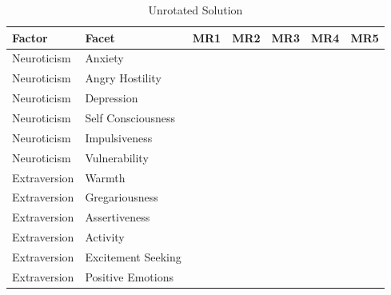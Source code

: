 \documentclass{article}\usepackage[]{graphicx}\usepackage[]{color}
\begin{document}
\begin{table}
\caption{\label{tab:unnamed-chunk-13}Unrotated Solution}
\centering
\begin{tabular}[t]{lllllll}
\toprule
Factor & Facet & MR1 & MR2 & MR3 & MR4 & MR5\\
\midrule
Neuroticism & Anxiety & \cellcolor{white}{0.26} & \cellcolor{yellow}{0.78} & \cellcolor{white}{0.25} & \cellcolor{white}{0.09} & \cellcolor{white}{0}\\
Neuroticism & Angry Hostility & \cellcolor{white}{0.03} & \cellcolor{white}{0.47} & \cellcolor{white}{0.12} & \cellcolor{yellow}{0.69} & \cellcolor{white}{0.02}\\
Neuroticism & Depression & \cellcolor{white}{0.08} & \cellcolor{yellow}{0.87} & \cellcolor{white}{0.05} & \cellcolor{white}{0.12} & \cellcolor{white}{-0.05}\\
Neuroticism & Self Consciousness & \cellcolor{white}{0.17} & \cellcolor{yellow}{0.72} & \cellcolor{white}{0.28} & \cellcolor{white}{-0.04} & \cellcolor{white}{0.03}\\
Neuroticism & Impulsiveness & \cellcolor{white}{0.29} & \cellcolor{white}{0.43} & \cellcolor{white}{-0.22} & \cellcolor{white}{0.31} & \cellcolor{white}{-0.18}\\
\addlinespace
Neuroticism & Vulnerability & \cellcolor{white}{0.05} & \cellcolor{yellow}{0.81} & \cellcolor{white}{0.12} & \cellcolor{white}{0.07} & \cellcolor{white}{-0.11}\\
Extraversion & Warmth & \cellcolor{yellow}{0.73} & \cellcolor{white}{-0.14} & \cellcolor{white}{-0.24} & \cellcolor{white}{-0.01} & \cellcolor{white}{-0.38}\\
Extraversion & Gregariousness & \cellcolor{yellow}{0.53} & \cellcolor{white}{-0.2} & \cellcolor{white}{-0.27} & \cellcolor{white}{0.19} & \cellcolor{white}{-0.34}\\
Extraversion & Assertiveness & \cellcolor{white}{0.47} & \cellcolor{white}{-0.42} & \cellcolor{white}{-0.04} & \cellcolor{white}{0.38} & \cellcolor{white}{-0.12}\\
Extraversion & Activity & \cellcolor{yellow}{0.62} & \cellcolor{white}{-0.21} & \cellcolor{white}{0.02} & \cellcolor{white}{0.38} & \cellcolor{white}{-0.02}\\
\addlinespace
Extraversion & Excitement Seeking & \cellcolor{white}{0.42} & \cellcolor{white}{-0.07} & \cellcolor{white}{-0.35} & \cellcolor{white}{0.22} & \cellcolor{white}{-0.01}\\
Extraversion & Positive Emotions & \cellcolor{yellow}{0.7} & \cellcolor{white}{-0.3} & \cellcolor{white}{-0.32} & \cellcolor{white}{-0.01} & \cellcolor{white}{-0.08}\\

\end{tabular}
\end{table}
\end{document}
